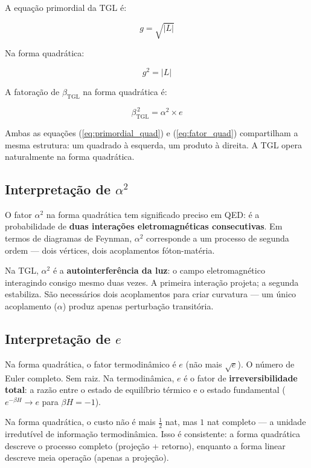 \documentclass[12pt,a4paper,twoside]{article}
\newcommand{\betatgl}{\beta_{\!\scriptscriptstyle\mathrm{TGL}}}
\begin{document}
A equação primordial da TGL é:

\begin{equation}
g = \sqrt{|L|}
\end{equation}

Na forma quadrática:

\begin{equation}
g^2 = |L|
\label{eq:primordial_quad}
\end{equation}

A fatoração de $\betatgl$ na forma quadrática é:

\begin{equation}
\betatgl^{\,2} = \alpha^2 \times e
\label{eq:fator_quad}
\end{equation}

Ambas as equações (\ref{eq:primordial_quad}) e (\ref{eq:fator_quad}) compartilham a mesma estrutura: um quadrado à esquerda, um produto à direita. A TGL opera naturalmente na forma quadrática.

\subsection{Interpretação de $\alpha^2$}

O fator $\alpha^2$ na forma quadrática tem significado preciso em QED: é a probabilidade de \textbf{duas interações eletromagnéticas consecutivas}. Em termos de diagramas de Feynman, $\alpha^2$ corresponde a um processo de segunda ordem --- dois vértices, dois acoplamentos fóton-matéria.

Na TGL, $\alpha^2$ é a \textbf{autointerferência da luz}: o campo eletromagnético interagindo consigo mesmo duas vezes. A primeira interação projeta; a segunda estabiliza. São necessários dois acoplamentos para criar curvatura --- um único acoplamento ($\alpha$) produz apenas perturbação transitória.

\subsection{Interpretação de $e$}

Na forma quadrática, o fator termodinâmico é $e$ (não mais $\sqrt{e}$). O número de Euler completo. Sem raiz. Na termodinâmica, $e$ é o fator de \textbf{irreversibilidade total}: a razão entre o estado de equilíbrio térmico e o estado fundamental ($e^{-\beta H} \to e$ para $\beta H = -1$).

Na forma quadrática, o custo não é mais $\frac{1}{2}$ nat, mas $1$ nat completo --- a unidade irredutível de informação termodinâmica. Isso é consistente: a forma quadrática descreve o processo completo (projeção + retorno), enquanto a forma linear descreve meia operação (apenas a projeção).
\end{document}
